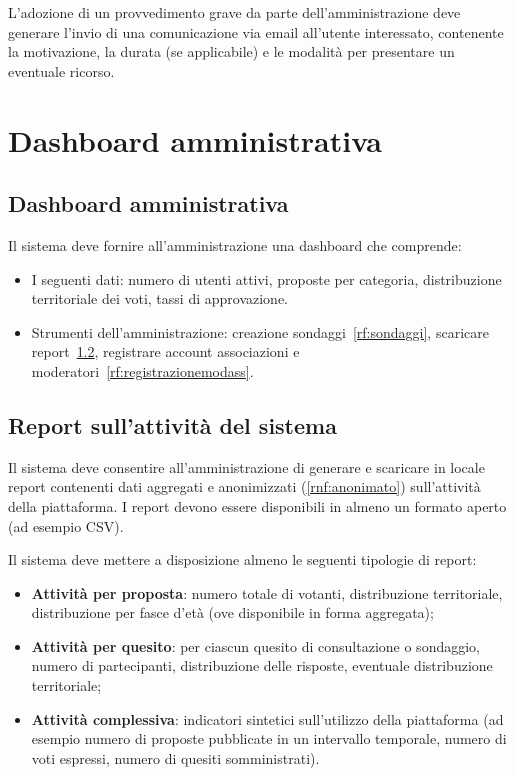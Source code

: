 \begin{rfscope}
L’adozione di un provvedimento grave da parte dell’amministrazione deve generare l’invio di una comunicazione via email all’utente interessato, contenente la motivazione, la durata (se applicabile) e le modalità per presentare un eventuale ricorso.

\section{Dashboard amministrativa}

\subsection{Dashboard amministrativa} \label{rf:dashboard}
Il sistema deve fornire all’amministrazione una dashboard che comprende:
\begin{itemize}
  \item I seguenti dati: numero di utenti attivi, proposte per categoria, distribuzione territoriale dei voti, tassi di approvazione.

  \item Strumenti dell’amministrazione: creazione sondaggi~\ref{rf:sondaggi}, scaricare report~\ref{rf:report}, registrare account associazioni e moderatori~\ref{rf:registrazionemodass}.
\end{itemize}

\subsection{Report sull’attività del sistema} \label{rf:report}
Il sistema deve consentire all’amministrazione di generare e scaricare in locale report contenenti dati aggregati e anonimizzati (\ref{rnf:anonimato}) sull’attività della piattaforma.
I report devono essere disponibili in almeno un formato aperto (ad esempio CSV).

Il sistema deve mettere a disposizione almeno le seguenti tipologie di report:
\begin{itemize}
  \item \textbf{Attività per proposta}: numero totale di votanti, distribuzione territoriale, distribuzione per fasce d’età (ove disponibile in forma aggregata);
  \item \textbf{Attività per quesito}: per ciascun quesito di consultazione o sondaggio, numero di partecipanti, distribuzione delle risposte, eventuale distribuzione territoriale;
  \item \textbf{Attività complessiva}: indicatori sintetici sull’utilizzo della piattaforma (ad esempio numero di proposte pubblicate in un intervallo temporale, numero di voti espressi, numero di quesiti somministrati).
\end{itemize}


\end{rfscope}
